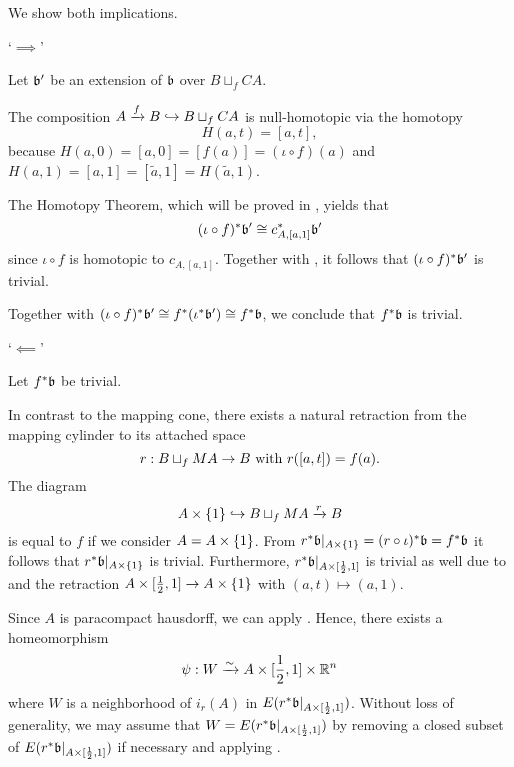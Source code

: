 \begin{myproof}
    We show both implications.

    `$\implies$'

    Let $\bb'$ be an extension of $\bb$ over $B \sqcup_f CA$.

    The composition $A \xrightarrow{f} B \hookrightarrow{} B \sqcup_f CA$ is
    null-homotopic via the homotopy
    \[ H(a, t) = [a, t], \]
    because $H(a, 0) = [a, 0] = [f(a)] = (\iota \circ f)(a)$
    and $H(a, 1) = [a, 1] = [\tilde{a}, 1] = H(\tilde{a}, 1)$.

    The Homotopy Theorem, which will be proved in ,
    yields that
    \[ \ind{(\iota \circ f)}\bb' \cong \ind{c_{A, [a, 1]}}\bb' \]
    since $\iota \circ f$ is homotopic to $c_{A, [a, 1]}$.
    Together with ,
    it follows that $\ind{(\iota \circ f)}\bb'$ is trivial.

    Together with $\ind{(\iota \circ f)}\bb' \cong \ind{f}(\ind{\iota}\bb') \cong \ind{f}\bb$,
    we conclude that $\ind{f}\bb$ is trivial.

    `$\impliedby$'

    Let $\ind{f}\bb$ be trivial.

    In contrast to the mapping cone,
    there exists a natural retraction from the mapping cylinder to its attached space
    \[ r: B \sqcup_f MA \to B \text{ with } r([a, t]) = f(a). \]
    The diagram
    \[ A \times \{1\} \hookrightarrow{} B \sqcup_f MA \xrightarrow{r} B \]
    is equal to $f$ if we consider $A = A \times{} \{1\}$.
    From $\ind{r}\bb[A \cross \{1\}] = \ind{(r \circ \iota)}\bb = \ind{f}\bb$ it follows that
    $\ind{r}\bb[A \cross \{1\}]$ is trivial.
    Furthermore, $\ind{r}\bb[A \cross [\half, 1]]$ is trivial as well
    due to  and the retraction
    $A \times [\frac{1}{2}, 1] \to A \times{} \{1\}$ with $(a, t) \mapsto (a, 1)$.

    Since $A$ is paracompact hausdorff, we can apply .
    Hence, there exists a homeomorphism
    \[ \psi: W \xrightarrow{\sim} A \times [\frac{1}{2}, 1] \times \mathbb{R}^n \]
    where $W$ is a neighborhood of $i_r(A)$ in $E(\ind{r}\bb[A \cross [\half, 1]])$.
    Without loss of generality,
    we may assume that $W = E(\ind{r}\bb[A \cross [\half, 1]])$
    by removing a closed subset of $E(\ind{r}\bb[A \cross [\half, 1]])$
    if necessary and applying .


\end{myproof}
